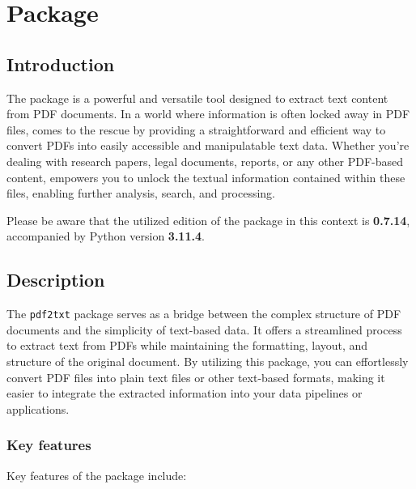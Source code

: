 %
%


\chapter{Package }


\section{Introduction}

The package  is a powerful and versatile tool designed to extract text content from PDF documents. In a world where information is often locked away in PDF files,  comes to the rescue by providing a straightforward and efficient way to convert PDFs into easily accessible and manipulatable text data. Whether you're dealing with research papers, legal documents, reports, or any other PDF-based content,  empowers you to unlock the textual information contained within these files, enabling further analysis, search, and processing. \cite{Fenniak:2008}

Please be aware that the utilized edition of the package  in this context is \textbf{0.7.14}, accompanied by Python version \textbf{3.11.4}.


\section{Description}

The \texttt{pdf2txt} package serves as a bridge between the complex structure of PDF documents and the simplicity of text-based data. It offers a streamlined process to extract text from PDFs while maintaining the formatting, layout, and structure of the original document. By utilizing this package, you can effortlessly convert PDF files into plain text files or other text-based formats, making it easier to integrate the extracted information into your data pipelines or applications.

\subsection{Key features}

Key features of the package  include:

